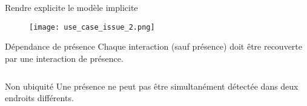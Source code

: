 \begin{frame}{Rendre explicite le modèle implicite}
  \addtocounter{framenumber}{-1}
  \begin{minipage}{0.3\linewidth}
      \begin{figure}
        \texttt{[image: use\_case\_issue\_2.png]}
      \end{figure}
    \end{minipage}
  \hfill
  \begin{minipage}{0.65\linewidth}
    \begin{coloredbox}[black]{Dépendance de présence}
      \footnotesize
      Chaque interaction (sauf présence) doit être recouverte par une interaction de présence.
      \small
      \begin{displaymath}
        \begin{array}{c}
        ~\\
        ~
        \end{array}
      \end{displaymath}
    \end{coloredbox}
    \begin{coloredbox}[black]{Non ubiquité}
      \footnotesize
      Une présence ne peut pas être simultanément détectée dans deux endroits différents.
      \small
      \begin{displaymath}
        \begin{array}{c}
         ~\\ 
         ~
        \end{array}
      \end{displaymath}
    \end{coloredbox}
  \end{minipage}
\end{frame}


